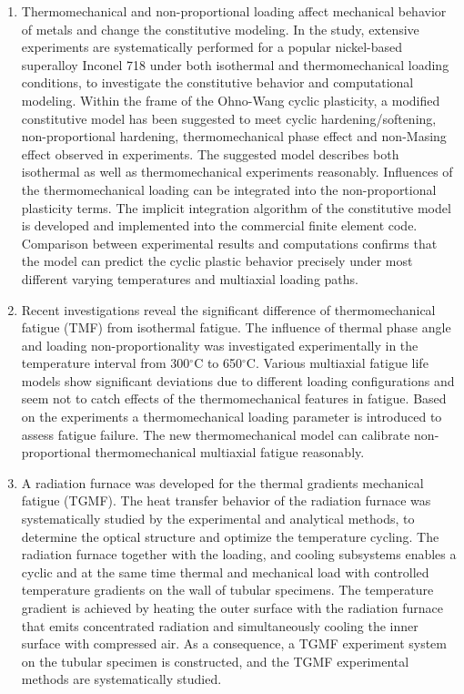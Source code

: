 \begin{enumerate}
\item Thermomechanical and non-proportional loading affect mechanical behavior of metals and change the constitutive modeling. In the study, extensive experiments are systematically performed for a popular nickel-based superalloy Inconel 718 under both isothermal and thermomechanical loading conditions, to investigate the constitutive behavior and computational modeling. Within the frame of the Ohno-Wang cyclic plasticity, a modified constitutive model has been suggested to meet cyclic hardening/softening, non-proportional hardening, thermomechanical phase effect and non-Masing effect observed in experiments. The suggested model describes both isothermal as well as thermomechanical experiments reasonably. Influences of the thermomechanical loading can be integrated into the non-proportional plasticity terms. The implicit integration algorithm of the constitutive model is developed and implemented into the commercial finite element code. Comparison between experimental results and computations confirms that the model can predict the cyclic plastic behavior precisely under most different varying temperatures and multiaxial loading paths.

\item Recent investigations reveal the significant difference of thermomechanical fatigue (TMF) from isothermal fatigue. The influence of thermal phase angle and loading non-proportionality was investigated experimentally in the temperature interval from 300$^\circ$C to 650$^\circ$C. Various multiaxial fatigue life models show significant deviations due to different loading configurations and seem not to catch effects of the thermomechanical features in fatigue. Based on the experiments a thermomechanical loading parameter is introduced to assess fatigue failure. The new thermomechanical model can calibrate non-proportional thermomechanical multiaxial fatigue reasonably.

\item A radiation furnace was developed for the thermal gradients mechanical fatigue (TGMF). The heat transfer behavior of the radiation furnace was systematically studied by the experimental and analytical methods, to determine the optical structure and optimize the temperature cycling. The radiation furnace together with the loading, and cooling subsystems enables a cyclic and at the same time thermal and mechanical load with controlled temperature gradients on the wall of tubular specimens. The temperature gradient is achieved by heating the outer surface with the radiation furnace that emits concentrated radiation and simultaneously cooling the inner surface with compressed air. As a consequence, a TGMF experiment system on the tubular specimen is constructed, and the TGMF experimental methods are systematically studied. 


\end{enumerate}
